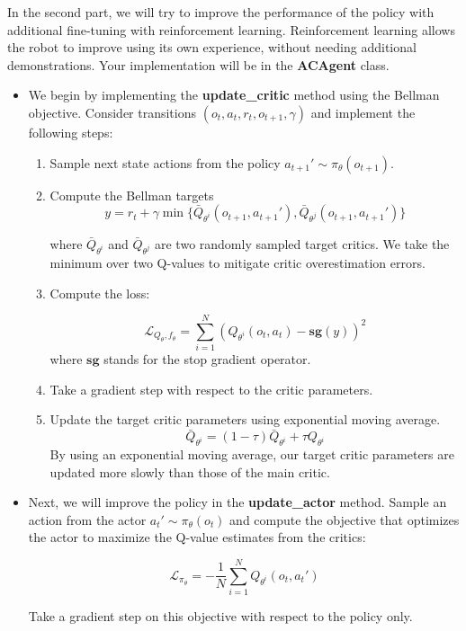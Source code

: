 \item {}
In the second part, we will try to improve the performance of the policy with additional fine-tuning with reinforcement learning. 
Reinforcement learning allows the robot to improve using its own experience, without needing additional demonstrations. Your implementation will be in the \textbf{ACAgent} class.

\begin{itemize}

    \item We begin by implementing the \textbf{update\_critic} method using the Bellman objective. Consider transitions $(o_t, a_t, r_t, o_{t+1}, \gamma)$ and implement the following steps:
    \begin{enumerate}[label=\roman*.]
        \item Sample next state actions from the policy $a_{t+1}'\sim \pi_{\theta}(o_{t+1})$.
        \item Compute the Bellman targets $$y = r_t + \gamma\min\{\bar{Q}_{\theta^i}(o_{t+1}, a_{t+1}'), \bar{Q}_{\theta^j}(o_{t+1}, a_{t+1}')\}$$

        where $\bar{Q}_{\theta^i}$ and $\bar{Q}_{\theta^j}$ are two randomly sampled target critics. We take the minimum over two Q-values to mitigate critic overestimation errors.
        \item Compute the loss:
            
            $$\mathcal{L}_{Q_{\theta}, f_{\theta}} = \sum_{i=1}^N (Q_{\theta^i}(o_{t}, a_t)-\mathbf{sg}(y))^2$$
        where $\mathbf{sg}$ stands for the stop gradient operator.
        \item Take a gradient step with respect to the critic parameters.
        \item Update the target critic parameters using exponential moving average.
        $$\bar{Q}_{\theta^i} = (1-\tau)\bar{Q}_{\theta^i} + \tau Q_{\theta^i}$$
        By using an exponential moving average, our target critic parameters are updated more slowly than those of the main critic.
    
    \end{enumerate}
    
    \item Next, we will improve the policy in the \textbf{update\_actor} method. Sample an action from the actor $a_t'\sim\pi_{\theta}(o_t)$ and compute the objective that optimizes the actor to maximize the Q-value estimates from the critics:

    $$\mathcal{L}_{\pi_{\theta}} = -\frac{1}{N}\sum_{i=1}^NQ_{\theta^i}(o_t, a_t')$$

    Take a gradient step on this objective with respect to the policy only.

\end{itemize}


